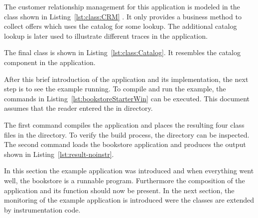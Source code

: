 

\noindent The customer relationship management for this application is modeled in the  class shown in Listing~\ref{lst:class:CRM} . It only provides a business method to collect offers which uses the catalog for some lookup. The additional catalog lookup is later used to illustrate different traces in the application.



\noindent The final class is  shown in Listing~\ref{lst:class:Catalog}. It resembles the catalog component in the application.



\noindent After this brief introduction of the application and its implementation, the next step is to see the example running. To compile and run the example, the commands in Listing~\ref{lst:bookstoreStarterWin} can be executed. This document assumes that the reader entered the in  directory.

\setBashListing
% 
%

\noindent The first command compiles the application and places the resulting four class files in the  directory. To verify the build process, the  directory can be inspected. The second command loads the bookstore application and produces the output shown in Listing~\ref{lst:result-noinstr}.



\noindent In this section the \Kieker{} example application was introduced and when everything went well, the bookstore is a runnable program. Furthermore the composition of the application and its function should now be present. In the next section, the monitoring of the example application is introduced were the classes are extended by instrumentation code.

